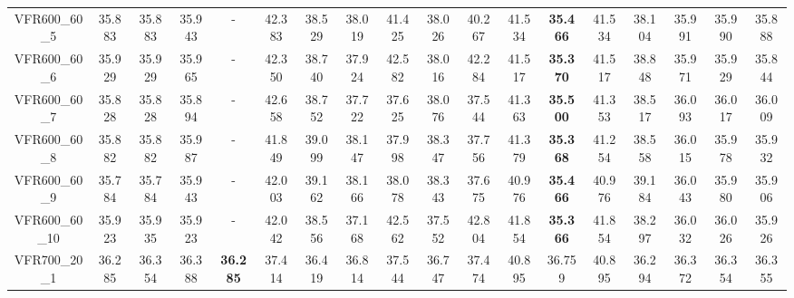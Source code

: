 \begin{tabular}{cc|ccc|ccccccccccccc}
VFR600\_60\_5      & 35.883           & 35.883           & 35.943           & -                & 42.383           & 38.529           & 38.019           & 41.425           & 38.026           & 40.267           & 41.534           & {\bf 35.466}     & 41.534           & 38.104           & 35.991           & 35.990           & 35.888          \\ 
VFR600\_60\_6      & 35.929           & 35.929           & 35.965           & -                & 42.350           & 38.740           & 37.924           & 42.582           & 38.016           & 42.284           & 41.517           & {\bf 35.370}     & 41.517           & 38.848           & 35.971           & 35.929           & 35.844          \\ 
VFR600\_60\_7      & 35.828           & 35.828           & 35.894           & -                & 42.658           & 38.752           & 37.722           & 37.625           & 38.076           & 37.544           & 41.363           & {\bf 35.500}     & 41.353           & 38.517           & 36.093           & 36.017           & 36.009          \\ 
VFR600\_60\_8      & 35.882           & 35.882           & 35.987           & -                & 41.849           & 39.099           & 38.147           & 37.998           & 38.347           & 37.756           & 41.379           & {\bf 35.368}     & 41.254           & 38.558           & 36.015           & 35.978           & 35.932          \\ 
VFR600\_60\_9      & 35.784           & 35.784           & 35.943           & -                & 42.003           & 39.162           & 38.166           & 38.078           & 38.343           & 37.675           & 40.976           & {\bf 35.466}     & 40.976           & 39.184           & 36.043           & 35.980           & 35.906          \\ 
VFR600\_60\_10     & 35.923           & 35.935           & 35.923           & -                & 42.042           & 38.556           & 37.168           & 42.562           & 37.552           & 42.804           & 41.854           & {\bf 35.366}     & 41.854           & 38.297           & 36.032           & 36.026           & 35.926          \\ 
VFR700\_20\_1      & 36.285           & 36.354           & 36.388           & {\bf 36.285}     & 37.414           & 36.419           & 36.814           & 37.544           & 36.747           & 37.474           & 40.895           & 36.759           & 40.895           & 36.294           & 36.372           & 36.354           & 36.355          \\ 

\end{tabular}
